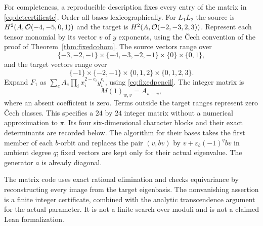 For completeness, a reproducible description fixes every entry of the
matrix in \eqref{eq:detcertificate}. Order all bases lexicographically.
For $L_1L_2$ the source is $H^2(A,\mathcal{O}(-4,-5,0,1))$ and the target is
$H^2(A,\mathcal{O}(-2,-3,2,3))$. Represent each tensor monomial by its vector
$v$ of $y$ exponents, using the \v Cech convention of the proof of
Theorem~\ref{thm:fixedcohom}. The source vectors range over
\[
 \{-3,-2,-1\}\times\{-4,-3,-2,-1\}\times\{0\}\times\{0,1\},
\]
and the target vectors range over
\[
 \{-1\}\times\{-2,-1\}\times\{0,1,2\}\times\{0,1,2,3\}.
\]
Expand $F_1$ as $\sum_e A_e\prod_i x_i^{2-e_i}y_i^{e_i}$, using
\eqref{eq:fixedpencil}. The integer matrix is
\[
 M(1)_{w,v}=A_{w-v},
\]
where an absent coefficient is zero. Terms outside the target ranges
represent zero \v Cech classes. This specifies a $24$ by $24$ integer
matrix without a numerical approximation to $\pi$.
Its four six-dimensional character blocks and their exact determinants
are recorded below. The algorithm for their bases takes the first member
of each $b$-orbit and replaces the pair $(v,bv)$ by
$v+\varepsilon_b(-1)^q bv$ in ambient degree $q$; fixed vectors are kept
only for their actual eigenvalue. The generator $a$ is already diagonal.


The matrix code uses exact rational elimination and checks equivariance
by reconstructing every image from the target eigenbasis. The
nonvanishing assertion is a finite integer certificate, combined with
the analytic transcendence argument for the actual parameter. It is not
a finite search over moduli and is not a claimed Lean formalization.

